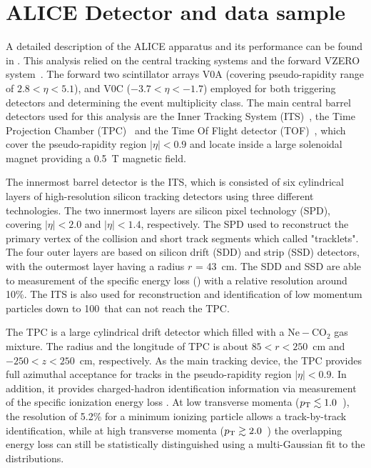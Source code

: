 \section{ALICE Detector and data sample}
\label{Sec:Detector}
A detailed description of the ALICE apparatus and its performance can be found in \cite{Collaboration_2008, Abelev:2014ffa}. This analysis relied on the central tracking systems and the forward VZERO system~\cite{collaboration_2013}. The forward two scintillator arrays V0A (covering pseudo-rapidity range of $2.8 < \eta < 5.1$), and V0C ($-3.7 < \eta < -1.7$) employed for both triggering detectors and determining the event multiplicity class. The main central barrel detectors used for this analysis are the Inner Tracking System (ITS)~\cite{collaboration_2010}, the Time Projection Chamber (TPC)~\cite{ALME2010316} and the Time Of Flight detector (TOF)~\cite{PIDwithTOF, TOF, TOFResults, Carnesecchi:2018oss}, which cover the pseudo-rapidity region $|\eta| < 0.9$ and locate inside a large solenoidal magnet providing a 0.5~T magnetic field. 

The innermost barrel detector is the ITS, which is consisted of six cylindrical layers of high-resolution silicon tracking detectors using three different technologies. The two innermost layers are silicon pixel technology (SPD), covering $|\eta| < 2.0$ and $|\eta| < 1.4$, respectively. The SPD used to reconstruct the primary vertex of the collision and short track segments which called "tracklets". The four outer layers are based on silicon drift (SDD) and strip (SSD) detectors, with the outermost layer having a radius $r$ = 43~cm. The SDD and SSD are able to measurement of the specific energy loss (\dEdx) with a relative resolution around 10\%. The ITS is also used for reconstruction and identification of low momentum particles down to 100~\MeVc that can not reach the TPC. 

The TPC is a large cylindrical drift detector which filled with a $\mathrm{Ne-CO_{2}}$ gas mixture. The radius and the longitude of TPC is about $85 < r < 250 $~cm and $-250 < z < 250 $~cm, respectively.
As the main tracking device, the TPC provides full azimuthal acceptance for tracks in the pseudo-rapidity region $|\eta| < 0.9$. In addition, it provides charged-hadron identification information via measurement of the specific ionization energy loss \dEdx. At low transverse momenta ($p_{\rm T} \lesssim 1.0$~\GeVc), the \dEdx resolution of 5.2\% for a minimum ionizing particle allows a track-by-track identification, while at high transverse momenta ($p_{\rm T} \gtrsim 2.0$~\GeVc) the overlapping energy loss can still be statistically distinguished using a multi-Gaussian fit to the \dEdx distributions.

